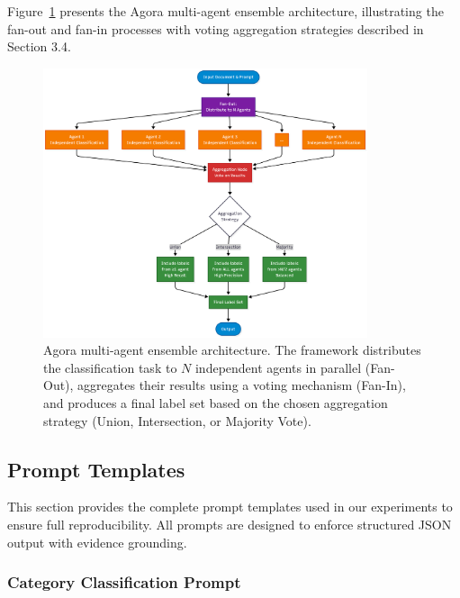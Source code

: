 Figure~\ref{fig:vote_based_ensemble} presents the Agora multi-agent ensemble architecture, illustrating the fan-out and fan-in processes with voting aggregation strategies described in Section 3.4.

\begin{figure}[!ht]
\centering
\includegraphics[width=0.85\textwidth]{assets/diagrams/vote-based.png}
\caption{Agora multi-agent ensemble architecture. The framework distributes the classification task to $N$ independent agents in parallel (Fan-Out), aggregates their results using a voting mechanism (Fan-In), and produces a final label set based on the chosen aggregation strategy (Union, Intersection, or Majority Vote).}
\label{fig:vote_based_ensemble}
\end{figure}

\subsection{Prompt Templates}
\label{appendix:prompts}

This section provides the complete prompt templates used in our experiments to ensure full reproducibility. All prompts are designed to enforce structured JSON output with evidence grounding.

\subsubsection{Category Classification Prompt}


